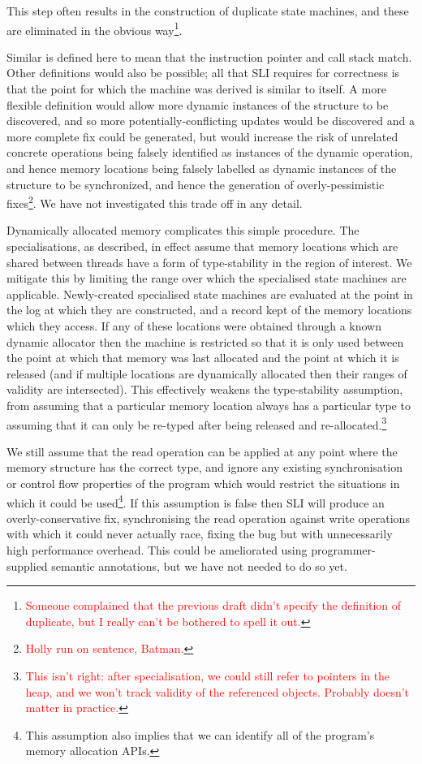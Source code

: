 \documentclass[10pt,twocolumn,preprint,natbib,authoryear]{sigplanconf}
\newcommand{\editorial}[1]{\textcolor{red}{\footnote{\textcolor{red}{#1}}}}
\begin{document}
This step often results in the construction of duplicate state
machines, and these are eliminated in the obvious
way\editorial{Someone complained that the previous draft didn't
  specify the definition of duplicate, but I really can't be bothered
  to spell it out.}.

Similar is defined here to mean that the instruction pointer and call
stack match.  Other definitions would also be possible; all that SLI
requires for correctness is that the point for which the machine was
derived is similar to itself.  A more flexible definition would allow
more dynamic instances of the structure to be discovered, and so more
potentially-conflicting updates would be discovered and a more
complete fix could be generated, but would increase the risk of
unrelated concrete operations being falsely identified as instances of
the dynamic operation, and hence memory locations being falsely
labelled as dynamic instances of the structure to be synchronized, and
hence the generation of overly-pessimistic fixes\editorial{Holly run
  on sentence, Batman.}.  We have not investigated this trade off in
any detail.

Dynamically allocated memory complicates this simple procedure.  The
specialisations, as described, in effect assume that memory locations
which are shared between threads have a form of type-stability in the
region of interest.  We mitigate this by limiting the range over which
the specialised state machines are applicable.  Newly-created
specialised state machines are evaluated at the point in the log at
which they are constructed, and a record kept of the memory locations
which they access.  If any of these locations were obtained through a
known dynamic allocator then the machine is restricted so that it is
only used between the point at which that memory was last allocated
and the point at which it is released (and if multiple locations are
dynamically allocated then their ranges of validity are intersected).
This effectively weakens the type-stability assumption, from assuming
that a particular memory location always has a particular type to
assuming that it can only be re-typed after being released and
re-allocated.\editorial{This isn't right: after specialisation, we
  could still refer to pointers in the heap, and we won't track
  validity of the referenced objects.  Probably doesn't matter in
  practice.}

We still assume that the read operation can be applied at any point
where the memory structure has the correct type, and ignore any
existing synchronisation or control flow properties of the program
which would restrict the situations in which it could be
used\footnote{This assumption also implies that we can identify all of
  the program's memory allocation APIs.}.  If this assumption is false
then SLI will produce an overly-conservative fix, synchronising the
read operation against write operations with which it could never
actually race, fixing the bug but with unnecessarily high performance
overhead.  This could be ameliorated using programmer-supplied
semantic annotations, but we have not needed to do so yet.
\end{document}
